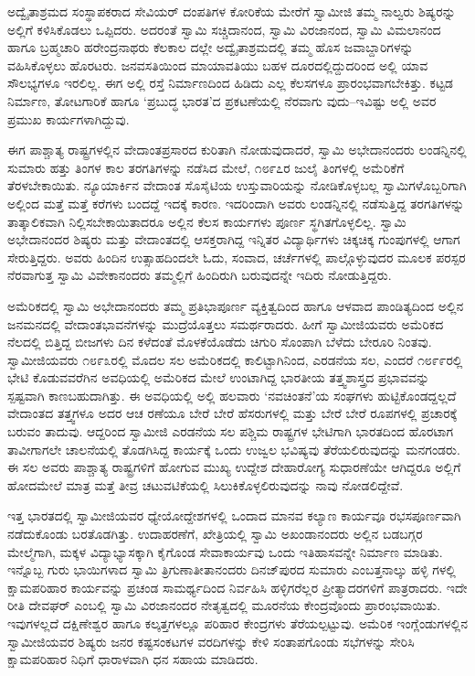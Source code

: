 ಅದ್ವೈತಾಶ್ರಮದ ಸಂಸ್ಥಾಪಕರಾದ ಸೇವಿಯರ್ ದಂಪತಿಗಳ ಕೋರಿಕೆಯ ಮೇರೆಗೆ ಸ್ವಾಮೀಜಿ ತಮ್ಮ ನಾಲ್ವರು ಶಿಷ್ಯರನ್ನು ಅಲ್ಲಿಗೆ ಕಳಿಸಿಕೊಡಲು ಒಪ್ಪಿದರು. ಅದರಂತೆ ಸ್ವಾಮಿ ಸಚ್ಚಿದಾನಂದ, ಸ್ವಾಮಿ ವಿರಜಾನಂದ, ಸ್ವಾಮಿ ವಿಮಲಾನಂದ ಹಾಗೂ ಬ್ರಹ್ಮಚಾರಿ ಹರೇಂದ್ರನಾಥರು ಕೆಲಕಾಲ ದಲ್ಲೇ ಅದ್ವೈತಾಶ್ರಮದಲ್ಲಿ ತಮ್ಮ ಹೊಸ ಜವಾಬ್ದಾರಿಗಳನ್ನು ವಹಿಸಿಕೊಳ್ಳಲು ಹೊರಟರು. ಜನವಸತಿಯಿಂದ ಮಾಯಾವತಿಯು ಬಹಳ ದೂರದಲ್ಲಿದ್ದುದರಿಂದ ಅಲ್ಲಿ ಯಾವ ಸೌಲಭ್ಯಗಳೂ ಇರಲಿಲ್ಲ. ಈಗ ಅಲ್ಲಿ ರಸ್ತೆ ನಿರ್ಮಾಣದಿಂದ ಹಿಡಿದು ಎಲ್ಲ ಕೆಲಸಗಳೂ ಪ್ರಾರಂಭವಾಗಬೇಕಿತ್ತು. ಕಟ್ಟಡ ನಿರ್ಮಾಣ, ತೋಟಗಾರಿಕೆ ಹಾಗೂ ‘ಪ್ರಬುದ್ಧ ಭಾರತ’ದ ಪ್ರಕಟಣೆಯಲ್ಲಿ ನೆರವಾಗು ವುದು–ಇವಿಷ್ಟು ಅಲ್ಲಿ ಅವರ ಪ್ರಮುಖ ಕಾರ್ಯಗಳಾಗಿದ್ದುವು.

ಈಗ ಪಾಶ್ಚಾತ್ಯ ರಾಷ್ಟ್ರಗಳಲ್ಲಿನ ವೇದಾಂತಪ್ರಸಾರದ ಕುರಿತಾಗಿ ನೋಡುವುದಾದರೆ, ಸ್ವಾಮಿ ಅಭೇದಾನಂದರು ಲಂಡನ್ನಿನಲ್ಲಿ ಸುಮಾರು ಹತ್ತು ತಿಂಗಳ ಕಾಲ ತರಗತಿಗಳನ್ನು ನಡೆಸಿದ ಮೇಲೆ, ೧೮೯೭ರ ಜುಲೈ ತಿಂಗಳಲ್ಲಿ ಅಮೆರಿಕೆಗೆ ತೆರಳಬೇಕಾಯಿತು. ನ್ಯೂಯಾರ್ಕಿನ ವೇದಾಂತ ಸೊಸೈಟಿಯ ಉಸ್ತುವಾರಿಯನ್ನು ನೋಡಿಕೊಳ್ಳಬಲ್ಲ ಸ್ವಾಮಿಗಳೊಬ್ಬರಿಗಾಗಿ ಅಲ್ಲಿಂದ ಮತ್ತೆ ಮತ್ತೆ ಕರೆಗಳು ಬಂದದ್ದೆ ಇದಕ್ಕೆ ಕಾರಣ. ಇದರಿಂದಾಗಿ ಅವರು ಲಂಡನ್ನಿನಲ್ಲಿ ನಡೆಸುತ್ತಿದ್ದ ತರಗತಿಗಳನ್ನು ತಾತ್ಕಾಲಿಕವಾಗಿ ನಿಲ್ಲಿಸಬೇಕಾಯಿತಾದರೂ ಅಲ್ಲಿನ ಕೆಲಸ ಕಾರ್ಯಗಳು ಪೂರ್ಣ ಸ್ಥಗಿತಗೊಳ್ಳಲಿಲ್ಲ. ಸ್ವಾಮಿ ಅಭೇದಾನಂದರ ಶಿಷ್ಯರು ಮತ್ತು ವೇದಾಂತದಲ್ಲಿ ಆಸಕ್ತರಾಗಿದ್ದ ಇನ್ನಿತರ ವಿದ್ಯಾರ್ಥಿಗಳು ಚಿಕ್ಕಚಿಕ್ಕ ಗುಂಪುಗಳಲ್ಲಿ ಆಗಾಗ ಸೇರುತ್ತಿದ್ದರು. ಅವರು ಹಿಂದಿನ ಉತ್ಸಾಹದಿಂದಲೇ ಓದು, ಸಂವಾದ, ಚರ್ಚೆಗಳಲ್ಲಿ ಪಾಲ್ಗೊಳ್ಳುವುದರ ಮೂಲಕ ಪರಸ್ಪರ ನೆರವಾಗುತ್ತ ಸ್ವಾಮಿ ವಿವೇಕಾನಂದರು ತಮ್ಮಲ್ಲಿಗೆ ಹಿಂದಿರುಗಿ ಬರುವುದನ್ನೇ ಇದಿರು ನೋಡುತ್ತಿದ್ದರು.

ಅಮೆರಿಕದಲ್ಲಿ ಸ್ವಾಮಿ ಅಭೇದಾನಂದರು ತಮ್ಮ ಪ್ರತಿಭಾಪೂರ್ಣ ವ್ಯಕ್ತಿತ್ವದಿಂದ ಹಾಗೂ ಆಳವಾದ ಪಾಂಡಿತ್ಯದಿಂದ ಅಲ್ಲಿನ ಜನಮನದಲ್ಲಿ ವೇದಾಂತಭಾವನೆಗಳನ್ನು ಮುದ್ರೆಯೊತ್ತಲು ಸಮರ್ಥರಾದರು. ಹೀಗೆ ಸ್ವಾಮೀಜಿಯವರು ಅಮೆರಿಕದ ನೆಲದಲ್ಲಿ ಬಿತ್ತಿದ್ದ ಬೀಜಗಳು ದಿನ ಕಳೆದಂತೆ ಮೊಳಕೆಯೊಡೆದು ಚಿಗುರಿ ಸೊಂಪಾಗಿ ಬೆಳೆದು ಬೇರೂರಿ ನಿಂತವು. ಸ್ವಾಮೀಜಿಯವರು ೧೮೯೩ರಲ್ಲಿ ಮೊದಲ ಸಲ ಅಮೆರಿಕದಲ್ಲಿ ಕಾಲಿಟ್ಟಾಗಿನಿಂದ, ಎರಡನೆಯ ಸಲ, ಎಂದರೆ ೧೮೯೯ರಲ್ಲಿ ಭೇಟಿ ಕೊಡುವವರೆಗಿನ ಅವಧಿಯಲ್ಲಿ ಅಮೆರಿಕದ ಮೇಲೆ ಉಂಟಾಗಿದ್ದ ಭಾರತೀಯ ತತ್ತ್ವಶಾಸ್ತ್ರದ ಪ್ರಭಾವವನ್ನು ಸ್ಪಷ್ಟವಾಗಿ ಕಾಣಬಹುದಾಗಿತ್ತು. ಈ ಅವಧಿಯಲ್ಲಿ ಅಲ್ಲಿ ಹಲವಾರು ‘ನವಚಿಂತನೆ’ಯ ಸಂಘಗಳು ಹುಟ್ಟಿಕೊಂಡದ್ದಲ್ಲದೆ ವೇದಾಂತದ ತತ್ತ್ವಗಳೂ ಅದರ ಆಚ ರಣೆಯೂ ಬೇರೆ ಬೇರೆ ಹೆಸರುಗಳಲ್ಲಿ ಮತ್ತು ಬೇರೆ ಬೇರೆ ರೂಪಗಳಲ್ಲಿ ಪ್ರಚಾರಕ್ಕೆ ಬರುವಂ ತಾದುವು. ಆದ್ದರಿಂದ ಸ್ವಾಮೀಜಿ ಎರಡನೆಯ ಸಲ ಪಶ್ಚಿಮ ರಾಷ್ಟ್ರಗಳ ಭೇಟಿಗಾಗಿ ಭಾರತದಿಂದ ಹೊರಟಾಗ ತಾವೀಗಾಗಲೇ ಚಾಲನೆಯಲ್ಲಿ ತೊಡಗಿಸಿದ್ದ ಕಾರ್ಯಕ್ಕೆ ಒಂದು ಉಜ್ವಲ ಭವಿಷ್ಯವು ತೆರೆಯಲಿರುವುದನ್ನು ಮನಗಂಡರು. ಈ ಸಲ ಅವರು ಪಾಶ್ಚಾತ್ಯ ರಾಷ್ಟ್ರಗಳಿಗೆ ಹೋಗುವ ಮುಖ್ಯ ಉದ್ದೇಶ ದೇಹಾರೋಗ್ಯ ಸುಧಾರಣೆಯೇ ಆಗಿದ್ದರೂ ಅಲ್ಲಿಗೆ ಹೋದಮೇಲೆ ಮಾತ್ರ ಮತ್ತೆ ತೀವ್ರ ಚಟುವಟಿಕೆಯಲ್ಲಿ ಸಿಲುಕಿಕೊಳ್ಳಲಿರುವುದನ್ನು ನಾವು ನೋಡಲಿದ್ದೇವೆ.

ಇತ್ತ ಭಾರತದಲ್ಲಿ ಸ್ವಾಮೀಜಿಯವರ ಧ್ಯೇಯೋದ್ದೇಶಗಳಲ್ಲಿ ಒಂದಾದ ಮಾನವ ಕಲ್ಯಾಣ ಕಾರ್ಯವೂ ರಭಸಪೂರ್ಣವಾಗಿ ನಡೆದುಕೊಂಡು ಬರತೊಡಗಿತ್ತು. ಉದಾಹರಣೆಗೆ, ಖೇತ್ರಿಯಲ್ಲಿ ಸ್ವಾಮಿ ಅಖಂಡಾನಂದರು ಅಲ್ಲಿನ ಬಡಬಗ್ಗರ ಮೇಲ್ಮೆಗಾಗಿ, ಮಕ್ಕಳ ವಿದ್ಯಾಭ್ಯಾಸಕ್ಕಾಗಿ ಕೈಗೊಂಡ ಸೇವಾಕಾರ್ಯವು ಒಂದು ಇತಿಹಾಸವನ್ನೇ ನಿರ್ಮಾಣ ಮಾಡಿತು. ಇನ್ನೊಬ್ಬ ಗುರು ಭಾಯಿಗಳಾದ ಸ್ವಾಮಿ ತ್ರಿಗುಣಾತೀತಾನಂದರು ದಿನಜ್​ಪುರದ ಸುಮಾರು ಎಂಬತ್ತನಾಲ್ಕು ಹಳ್ಳಿ ಗಳಲ್ಲಿ ಕ್ಷಾಮಪರಿಹಾರ ಕಾರ್ಯವನ್ನು ಪ್ರಚಂಡ ಸಾಮರ್ಥ್ಯದಿಂದ ನಿರ್ವಹಿಸಿ ಹಳ್ಳಿಗರೆಲ್ಲರ ಪ್ರೀತ್ಯಾದರಗಳಿಗೆ ಪಾತ್ರರಾದರು. ಇದೇ ರೀತಿ ದೇವಘರ್ ಎಂಬಲ್ಲಿ ಸ್ವಾಮಿ ವಿರಜಾನಂದರ ನೇತೃತ್ವದಲ್ಲಿ ಮೂರನೆಯ ಕೇಂದ್ರವೊಂದು ಪ್ರಾರಂಭವಾಯಿತು. ಇವುಗಳಲ್ಲದೆ ದಕ್ಷಿಣೇಶ್ವರ ಹಾಗೂ ಕಲ್ಕತ್ತಗಳಲ್ಲೂ ಪರಿಹಾರ ಕೇಂದ್ರಗಳು ತೆರೆಯಲ್ಪಟ್ಟುವು. ಅಮೆರಿಕ ಇಂಗ್ಲೆಂಡುಗಳಲ್ಲಿನ ಸ್ವಾಮೀಜಿಯವರ ಶಿಷ್ಯರು ಜನರ ಕಷ್ಟಸಂಕಟಗಳ ವರದಿಗಳನ್ನು ಕೇಳಿ ಸಂತಾಪಗೊಂಡು ಸಭೆಗಳನ್ನು ಸೇರಿಸಿ ಕ್ಷಾಮಪರಿಹಾರ ನಿಧಿಗೆ ಧಾರಾಳವಾಗಿ ಧನ ಸಹಾಯ ಮಾಡಿದರು.

